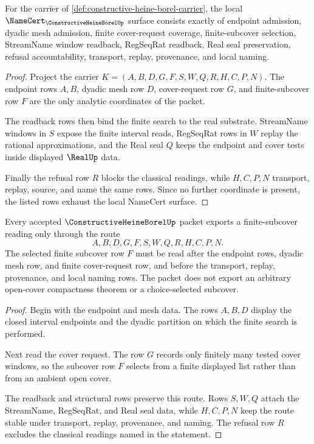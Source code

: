 \begin{theorem}
\label{thm:constructive-heine-borel-namecert-obligations}
For the carrier of \autoref{def:constructive-heine-borel-carrier}, the local $\NameCert_{\ConstructiveHeineBorelUp}$ surface consists exactly of endpoint admission, dyadic mesh admission, finite cover-request coverage, finite-subcover selection, StreamName window readback, RegSeqRat readback, Real seal preservation, refusal accountability, transport, replay, provenance, and local naming.
\end{theorem}
\begin{proof}
Project the carrier $K=(A,B,D,G,F,S,W,Q,R,H,C,P,N)$. The endpoint rows $A,B$, dyadic mesh row $D$, cover-request row $G$, and finite-subcover row $F$ are the only analytic coordinates of the packet.

The readback rows then bind the finite search to the real substrate. StreamName windows in $S$ expose the finite interval reads, RegSeqRat rows in $W$ replay the rational approximations, and the Real seal $Q$ keeps the endpoint and cover tests inside displayed $\RealUp$ data.

Finally the refusal row $R$ blocks the classical readings, while $H,C,P,N$ transport, replay, source, and name the same rows. Since no further coordinate is present, the listed rows exhaust the local NameCert surface.
\end{proof}

\begin{theorem}
\label{thm:constructive-heine-borel-finite-subcover-route}
Every accepted $\ConstructiveHeineBorelUp$ packet exports a finite-subcover reading only through the route
$$
A,B,D,G,F,S,W,Q,R,H,C,P,N .
$$
The selected finite subcover row $F$ must be read after the endpoint rows, dyadic mesh row, and finite cover-request row, and before the transport, replay, provenance, and local naming rows. The packet does not export an arbitrary open-cover compactness theorem or a choice-selected subcover.
\end{theorem}
\begin{proof}
Begin with the endpoint and mesh data. The rows $A,B,D$ display the closed interval endpoints and the dyadic partition on which the finite search is performed.

Next read the cover request. The row $G$ records only finitely many tested cover windows, so the subcover row $F$ selects from a finite displayed list rather than from an ambient open cover.

The readback and structural rows preserve this route. Rows $S,W,Q$ attach the StreamName, RegSeqRat, and Real seal data, while $H,C,P,N$ keep the route stable under transport, replay, provenance, and naming. The refusal row $R$ excludes the classical readings named in the statement.
\end{proof}

